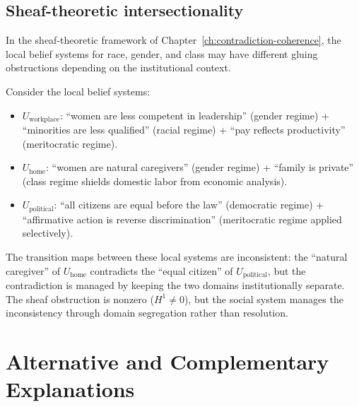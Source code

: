 \subsection{Sheaf-theoretic intersectionality}

In the sheaf-theoretic framework of Chapter~\ref{ch:contradiction-coherence}, the local belief systems for race, gender, and class may have different gluing obstructions depending on the institutional context.

\begin{example}
\label{ex:sheaf-intersection}
Consider the local belief systems:
\begin{itemize}[nosep]
  \item $U_{\text{workplace}}$: ``women are less competent in leadership'' (gender regime) + ``minorities are less qualified'' (racial regime) + ``pay reflects productivity'' (meritocratic regime).
  \item $U_{\text{home}}$: ``women are natural caregivers'' (gender regime) + ``family is private'' (class regime shields domestic labor from economic analysis).
  \item $U_{\text{political}}$: ``all citizens are equal before the law'' (democratic regime) + ``affirmative action is reverse discrimination'' (meritocratic regime applied selectively).
\end{itemize}
The transition maps between these local systems are inconsistent: the ``natural caregiver'' of $U_{\text{home}}$ contradicts the ``equal citizen'' of $U_{\text{political}}$, but the contradiction is managed by keeping the two domains institutionally separate.
The sheaf obstruction is nonzero ($H^1 \neq 0$), but the social system manages the inconsistency through domain segregation rather than resolution.
\end{example}

\section{Alternative and Complementary Explanations}
\label{sec:ch25-alternatives}

